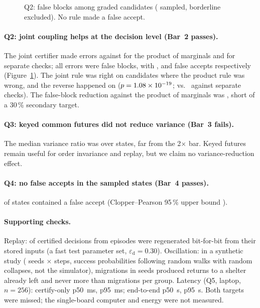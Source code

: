 \documentclass[letterpaper]{article}
\newcommand{\epsd}{\varepsilon_{\mathrm{d}}}
\begin{document}
\begin{figure}[t]
\centering

\caption{Q2: false blocks among \nQtwoGraded{} graded candidates (\nQtwoCandidates{} sampled, \nQtwoBorderline{}
borderline excluded). No rule made a false accept.}
\label{fig:q2}
\end{figure}

\paragraph{Q2: joint coupling helps at the decision level (Bar~2 passes).} The joint certifier made
\nFBJoint{} errors against \nFBProduct{} for the product of marginals and \nFBSeparate{} for separate
checks; all errors were false blocks, with \nFAJoint, \nFAProduct{} and \nFASeparate{} false accepts
respectively (Figure~\ref{fig:q2}). The joint rule was right on \nMcNJointOnly{} candidates where the
product rule was wrong, and the reverse happened on \nMcNOtherOnly{} ($p=1.08\times10^{-19}$; \nMcNSepJointOnly{}
vs.\ \nMcNSepOtherOnly{} against separate checks). The false-block reduction against the product of
marginals was \nFBReduction, short of a 30\,\% secondary target.

\paragraph{Q3: keyed common futures did not reduce variance (Bar~3 fails).} The median variance ratio
was \nVarRatio{} over \nQthreeStates{} states, far from the 2$\times$ bar. Keyed futures remain useful for
order invariance and replay, but we claim no variance-reduction effect.

\paragraph{Q4: no false accepts in the sampled states (Bar~4 passes).} \nQfourFA{} of
\nQfourStates{} states contained a false accept (Clopper--Pearson 95\,\% upper bound \nQfourUpper).

\paragraph{Supporting checks.} Replay: \nReplayMatched{} of \nReplayN{} certified decisions from
\nReplaySeeds{} episodes were regenerated bit-for-bit from their stored inputs (a fast test
parameter set, $\epsd=0.30$). Oscillation: in a synthetic study (\nFlipSeeds{} seeds $\times$
\nFlipSteps{} steps, success probabilities following random walks with random collapses, not the
simulator), \nFlipMigrations{} migrations in \nFlipSeedsWithMig{} seeds produced \nFlipReturns{} returns to
a shelter already left and never more than \nFlipMaxMig{} migrations per group. Latency (Q5, laptop,
$n=256$): certify-only p50 \nLatCertPfifty\,ms, p95 \nLatCertPninetyfive\,ms; end-to-end p50
\nLatEtePfifty\,s, p95 \nLatEtePninetyfive\,s. Both targets were missed; the single-board computer and
energy were not measured.
\end{document}
